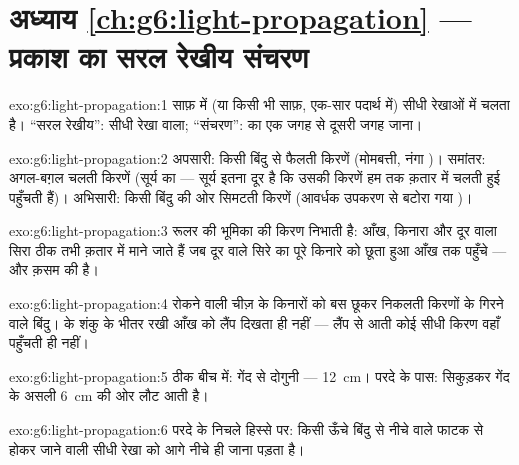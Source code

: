 \section*{अध्याय \ref{ch:g6:light-propagation} --- प्रकाश का सरल रेखीय संचरण}

\begin{solution}{exo:g6:light-propagation:1}
साफ़  में (या किसी भी साफ़, एक-सार पदार्थ में)  सीधी रेखाओं
में चलता है। ``सरल रेखीय'': सीधी रेखा वाला; ``संचरण'':  का एक
जगह से दूसरी जगह जाना।
\end{solution}

\begin{solution}{exo:g6:light-propagation:2}
अपसारी: किसी बिंदु से फैलती किरणें (मोमबत्ती, नंगा )। समांतर:
अगल-बग़ल चलती किरणें (सूर्य का  --- सूर्य इतना दूर है कि उसकी
किरणें हम तक क़तार में चलती हुई पहुँचती हैं)। अभिसारी: किसी बिंदु की
ओर सिमटती किरणें (आवर्धक उपकरण से बटोरा गया )।
\end{solution}

\begin{solution}{exo:g6:light-propagation:3}
रूलर की भूमिका  की किरण निभाती है: आँख, किनारा और दूर वाला सिरा
ठीक तभी क़तार में माने जाते हैं जब दूर वाले सिरे का  पूरे किनारे
को छूता हुआ आँख तक पहुँचे --- और क़सम  की है।
\end{solution}

\begin{solution}{exo:g6:light-propagation:4}
रोकने वाली चीज़ के किनारों को बस छूकर निकलती किरणों के गिरने वाले
बिंदु।  के शंकु के भीतर रखी आँख को लैंप दिखता ही नहीं --- लैंप से
आती कोई सीधी किरण वहाँ पहुँचती ही नहीं।
\end{solution}

\begin{solution}{exo:g6:light-propagation:5}
ठीक बीच में:  गेंद से दोगुनी --- \qty{12}{cm}। परदे के पास:
 सिकुड़कर गेंद के असली \qty{6}{cm} की ओर लौट आती है।
\end{solution}

\begin{solution}{exo:g6:light-propagation:6}
परदे के निचले हिस्से पर: किसी ऊँचे बिंदु से नीचे वाले फाटक से होकर
जाने वाली सीधी रेखा को आगे नीचे ही जाना पड़ता है।
\end{solution}


